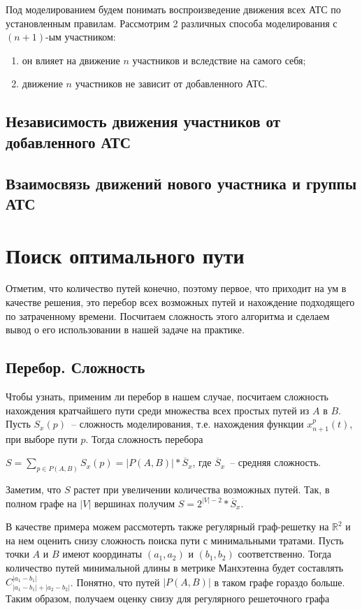 \documentclass[12pt, a4paper]{article}
\begin{document}
Под моделированием будем понимать воспроизведение движения всех АТС по установленным правилам. Рассмотрим 2 различных способа моделирования с $(n+1)$-ым участником: 
\begin{enumerate}
	\item он влияет на движение $n$ участников и вследствие на самого себя;
	\item движение $n$ участников не зависит от добавленного АТС.
\end{enumerate}

\subsection{Независимость движения участников от добавленного АТС}
\subsection{Взаимосвязь движений нового участника и группы АТС}

\newpage
\section{Поиск оптимального пути}

Отметим, что количество путей конечно, поэтому первое, что приходит на ум в качестве решения, это перебор всех возможных путей и нахождение подходящего по затраченному времени. Посчитаем сложность этого алгоритма и сделаем вывод о его использовании в нашей задаче на практике.

\subsection{Перебор. Сложность}
Чтобы узнать, применим ли перебор в нашем случае, посчитаем сложность нахождения кратчайшего пути среди множества всех простых путей из $A$ в $B$. Пусть $S_x(p)$~-- сложность моделирования, т.е. нахождения функции $x^p_{n+1}(t)$, при выборе пути $p$. Тогда сложность перебора
\begin{center}
 $S = \sum\limits_{p \in P(A,B)} S_x(p) = \vert P(A,B) \vert * \overline S_x$, где $\overline S_x$~-- средняя сложность.
\end{center}
Заметим, что $ S $ растет при увеличении количества возможных путей. Так, в полном графе на $\vert V \vert$ вершинах получим $S = 2^{|V|-2} * \overline S_x$.

В качестве примера можем рассмотерть также регулярный граф-решетку на $\mathbb {R}^2$ и на нем оценить снизу сложность поиска пути с минимальными тратами. Пусть точки $A$ и $B$ имеют координаты $(a_1, a_2)$ и $(b_1, b_2)$ соответственно. Тогда количество путей минимальной длины в метрике Манхэтенна будет составлять $C^{|a_1-b_1|}_{|a_1-b_1| + |a_2-b_2|}$. Понятно, что путей $|P(A,B)|$ в таком графе гораздо больше. Таким образом, получаем оценку снизу для регулярного решеточного графа
\end{document}

